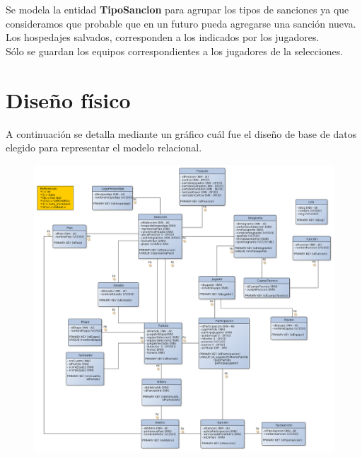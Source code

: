 \documentclass[11pt, a4paper, spanish]{article}
\begin{document}
{{{    Se modela la entidad \textbf{TipoSancion} para agrupar los tipos de sanciones ya que consideramos que probable que en un futuro pueda agregarse una sanci\'on nueva.
    Los hospedajes salvados, corresponden a los indicados por los jugadores.\\

    S\'olo se guardan los equipos correspondientes a los jugadores de la selecciones.


\newpage 
\section{Dise\~{n}o f\'isico}

A continuaci\'on se detalla mediante un gr\'afico cu\'al fue el dise\~{n}o de base de datos elegido para representar el modelo relacional.

 
\begin{figure}[hb]
  \centering
  \includegraphics[scale=0.37]{diagramas/DiagramaFisico.png}\\
\end{figure}




}}}
\end{document}
